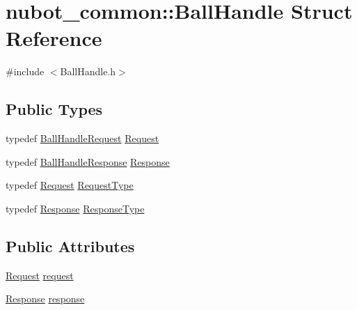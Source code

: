 \hypertarget{structnubot__common_1_1BallHandle}{\section{nubot\-\_\-common\-:\-:Ball\-Handle Struct Reference}
\label{structnubot__common_1_1BallHandle}
}


{\ttfamily \#include $<$Ball\-Handle.\-h$>$}

\subsection*{Public Types}
\begin{DoxyCompactItemize}
\item 
typedef \hyperlink{namespacenubot__common_a47b9531f744aace81704d183c8f37107}{Ball\-Handle\-Request} \hyperlink{structnubot__common_1_1BallHandle_a02af01a2f731b0fc249f1cf9df23a00e}{Request}
\item 
typedef \hyperlink{namespacenubot__common_a794ba6eb699c7139e7256886a99845bb}{Ball\-Handle\-Response} \hyperlink{structnubot__common_1_1BallHandle_a6c4cc1c333d5fe1cfc569ee22b68ba89}{Response}
\item 
typedef \hyperlink{structnubot__common_1_1BallHandle_a02af01a2f731b0fc249f1cf9df23a00e}{Request} \hyperlink{structnubot__common_1_1BallHandle_a942e61b75f91a2f8220764e8c3d6ad05}{Request\-Type}
\item 
typedef \hyperlink{structnubot__common_1_1BallHandle_a6c4cc1c333d5fe1cfc569ee22b68ba89}{Response} \hyperlink{structnubot__common_1_1BallHandle_a9a45e8a947e8ad893d67e8526d98b3d5}{Response\-Type}
\end{DoxyCompactItemize}
\subsection*{Public Attributes}
\begin{DoxyCompactItemize}
\item 
\hyperlink{structnubot__common_1_1BallHandle_a02af01a2f731b0fc249f1cf9df23a00e}{Request} \hyperlink{structnubot__common_1_1BallHandle_ad7035cd66ffcd868080ea27b5a37f5fd}{request}
\item 
\hyperlink{structnubot__common_1_1BallHandle_a6c4cc1c333d5fe1cfc569ee22b68ba89}{Response} \hyperlink{structnubot__common_1_1BallHandle_acbc867111f0d45b35e263dd048e86a24}{response}
\end{DoxyCompactItemize}


